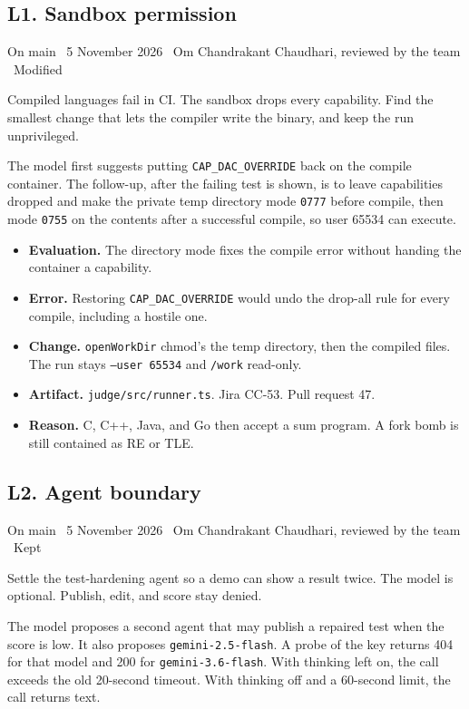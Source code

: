 \documentclass[11pt,a4paper]{article}
\newcommand{\meta}[1]{{\small #1}\par}
\newcommand{\step}[1]{\par\vspace{0.15em}{\bfseries #1}\par\vspace{-0.15em}}
\begin{document}
\subsection{L1. Sandbox permission}
\meta{On main \textperiodcentered\ 5 November 2026 \textperiodcentered\ Om Chandrakant Chaudhari, reviewed by the team \textperiodcentered\ Modified}

\step{1. Prompt}
Compiled languages fail in CI. The sandbox drops every capability. Find the smallest change that lets the compiler write the binary, and keep the run unprivileged.

\step{2. Reply (summarised)}
The model first suggests putting \texttt{CAP\_DAC\_OVERRIDE} back on the compile container. The follow-up, after the failing test is shown, is to leave capabilities dropped and make the private temp directory mode \texttt{0777} before compile, then mode \texttt{0755} on the contents after a successful compile, so user 65534 can execute.

\step{3. Decision}
\begin{itemize}
\item \textbf{Evaluation.} The directory mode fixes the compile error without handing the container a capability.
\item \textbf{Error.} Restoring \texttt{CAP\_DAC\_OVERRIDE} would undo the drop-all rule for every compile, including a hostile one.
\item \textbf{Change.} \texttt{openWorkDir} chmod's the temp directory, then the compiled files. The run stays \texttt{--user 65534} and \texttt{/work} read-only.
\item \textbf{Artifact.} \texttt{judge/src/runner.ts}. Jira CC-53. Pull request 47.
\item \textbf{Reason.} C, C++, Java, and Go then accept a sum program. A fork bomb is still contained as RE or TLE.
\end{itemize}

\subsection{L2. Agent boundary}
\meta{On main \textperiodcentered\ 5 November 2026 \textperiodcentered\ Om Chandrakant Chaudhari, reviewed by the team \textperiodcentered\ Kept}

\step{1. Prompt}
Settle the test-hardening agent so a demo can show a result twice. The model is optional. Publish, edit, and score stay denied.

\step{2. Reply (summarised)}
The model proposes a second agent that may publish a repaired test when the score is low. It also proposes \texttt{gemini-2.5-flash}. A probe of the key returns 404 for that model and 200 for \texttt{gemini-3.6-flash}. With thinking left on, the call exceeds the old 20-second timeout. With thinking off and a 60-second limit, the call returns text.
\end{document}

